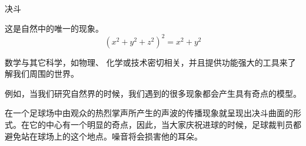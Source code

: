 ﻿\begin{surferPage}{决斗}

这是自然中的唯一的现象。\\
\smallskip
\[(x^2+ y^2+ z^2)^2	= x^2+ y^2\]

\singlespacing

数学与其它科学，如物理、 化学或技术密切相关，并且提供功能强大的工具来了解我们周围的世界。

\singlespacing

例如，当我们研究自然界的时候，我们遇到的很多现象都会产生具有奇点的模型。

\singlespacing

在一个足球场中由观众的热烈掌声所产生的声波的传播现象就呈现出决斗曲面的形式。在它的中心有一个明显的奇点，因此，当大家庆祝进球的时候，足球裁判员都避免站在球场上的这个地点。噪音将会损害他的耳朵。

\end{surferPage}
